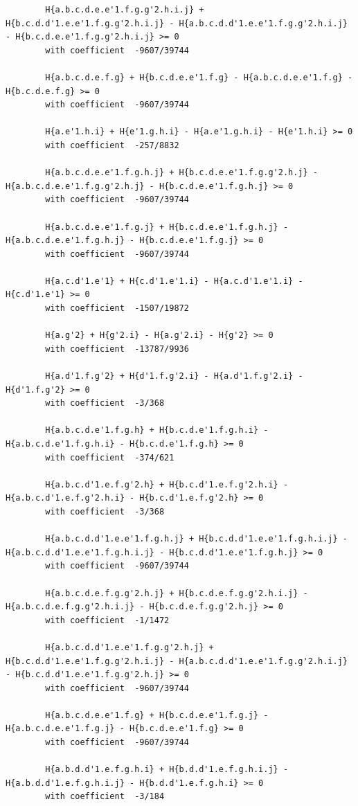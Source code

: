 \documentclass[11pt, a4paper]{kybernetika}
\begin{document}
\begin{verbatim}
		H{a.b.c.d.e.e'1.f.g.g'2.h.i.j} + H{b.c.d.d'1.e.e'1.f.g.g'2.h.i.j} - H{a.b.c.d.d'1.e.e'1.f.g.g'2.h.i.j} - H{b.c.d.e.e'1.f.g.g'2.h.i.j} >= 0
		with coefficient  -9607/39744
		
		H{a.b.c.d.e.f.g} + H{b.c.d.e.e'1.f.g} - H{a.b.c.d.e.e'1.f.g} - H{b.c.d.e.f.g} >= 0
		with coefficient  -9607/39744
		
		H{a.e'1.h.i} + H{e'1.g.h.i} - H{a.e'1.g.h.i} - H{e'1.h.i} >= 0
		with coefficient  -257/8832
		
		H{a.b.c.d.e.e'1.f.g.h.j} + H{b.c.d.e.e'1.f.g.g'2.h.j} - H{a.b.c.d.e.e'1.f.g.g'2.h.j} - H{b.c.d.e.e'1.f.g.h.j} >= 0
		with coefficient  -9607/39744
		
		H{a.b.c.d.e.e'1.f.g.j} + H{b.c.d.e.e'1.f.g.h.j} - H{a.b.c.d.e.e'1.f.g.h.j} - H{b.c.d.e.e'1.f.g.j} >= 0
		with coefficient  -9607/39744
		
		H{a.c.d'1.e'1} + H{c.d'1.e'1.i} - H{a.c.d'1.e'1.i} - H{c.d'1.e'1} >= 0
		with coefficient  -1507/19872
		
		H{a.g'2} + H{g'2.i} - H{a.g'2.i} - H{g'2} >= 0
		with coefficient  -13787/9936
		
		H{a.d'1.f.g'2} + H{d'1.f.g'2.i} - H{a.d'1.f.g'2.i} - H{d'1.f.g'2} >= 0
		with coefficient  -3/368
		
		H{a.b.c.d.e'1.f.g.h} + H{b.c.d.e'1.f.g.h.i} - H{a.b.c.d.e'1.f.g.h.i} - H{b.c.d.e'1.f.g.h} >= 0
		with coefficient  -374/621
		
		H{a.b.c.d'1.e.f.g'2.h} + H{b.c.d'1.e.f.g'2.h.i} - H{a.b.c.d'1.e.f.g'2.h.i} - H{b.c.d'1.e.f.g'2.h} >= 0
		with coefficient  -3/368
		
		H{a.b.c.d.d'1.e.e'1.f.g.h.j} + H{b.c.d.d'1.e.e'1.f.g.h.i.j} - H{a.b.c.d.d'1.e.e'1.f.g.h.i.j} - H{b.c.d.d'1.e.e'1.f.g.h.j} >= 0
		with coefficient  -9607/39744
		
		H{a.b.c.d.e.f.g.g'2.h.j} + H{b.c.d.e.f.g.g'2.h.i.j} - H{a.b.c.d.e.f.g.g'2.h.i.j} - H{b.c.d.e.f.g.g'2.h.j} >= 0
		with coefficient  -1/1472
		
		H{a.b.c.d.d'1.e.e'1.f.g.g'2.h.j} + H{b.c.d.d'1.e.e'1.f.g.g'2.h.i.j} - H{a.b.c.d.d'1.e.e'1.f.g.g'2.h.i.j} - H{b.c.d.d'1.e.e'1.f.g.g'2.h.j} >= 0
		with coefficient  -9607/39744
		
		H{a.b.c.d.e.e'1.f.g} + H{b.c.d.e.e'1.f.g.j} - H{a.b.c.d.e.e'1.f.g.j} - H{b.c.d.e.e'1.f.g} >= 0
		with coefficient  -9607/39744
		
		H{a.b.d.d'1.e.f.g.h.i} + H{b.d.d'1.e.f.g.h.i.j} - H{a.b.d.d'1.e.f.g.h.i.j} - H{b.d.d'1.e.f.g.h.i} >= 0
		with coefficient  -3/184
		

\end{verbatim}
\end{document}
